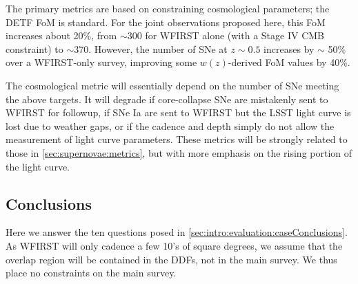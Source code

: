 
The primary metrics are based on constraining cosmological parameters;
the DETF FoM is standard. For the joint observations proposed here, this
FoM increases about 20\%, from $\sim 300$ for WFIRST alone (with a Stage
IV CMB constraint) to $\sim 370$. However, the number of SNe at $z \sim
0.5$ increases by $\sim$ 50\% over a WFIRST-only survey, improving some
$w(z)$-derived FoM values by 40\%.

The cosmological metric will essentially depend on the number of SNe
meeting the above targets. It will degrade if core-collapse SNe are
mistakenly sent to WFIRST for followup, if SNe Ia are sent to WFIRST but
the LSST light curve is lost due to weather gaps, or if the cadence and
depth simply do not allow the measurement of light curve parameters.
These metrics will be strongly related to those in
\autoref{sec:supernovae:metrics}, but with more emphasis on the rising
portion of the light curve.








%
\subsection{Conclusions}

Here we answer the ten questions posed in
\autoref{sec:intro:evaluation:caseConclusions}. As WFIRST will only cadence a few 10's of square degrees, we assume that the overlap region will be contained in the DDFs, not in the main survey. We thus place no constraints on the main survey.

